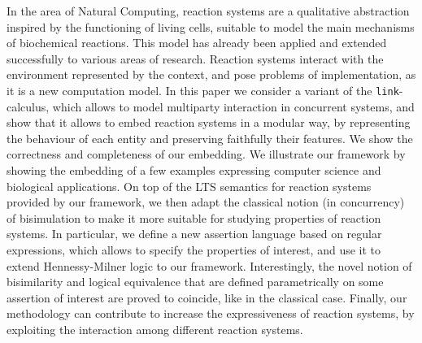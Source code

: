 
In the area of Natural Computing, reaction systems are
a qualitative abstraction inspired by the 
functioning of living cells, suitable to model the main
mechanisms of biochemical reactions.
This model has already been applied
and extended successfully to various areas of research. Reaction 
systems interact with the environment represented by the context, and
pose problems of implementation, as it is a new computation model. 
In this paper we consider a variant of the {\tt link}-calculus, which allows to model 
multiparty interaction in concurrent systems, and show that it allows to
embed reaction systems in a modular way, by representing the behaviour of each entity and
preserving faithfully their features. 
We show the correctness and completeness 
of our embedding.
We illustrate our framework by showing the embedding of 
a few examples expressing computer science
and biological applications.
On top of the LTS semantics for reaction systems provided by our framework, 
we then adapt the classical notion (in concurrency) of bisimulation
to make it more suitable for studying properties of reaction systems.
In particular, we define a new assertion language based on regular expressions, 
which allows to specify the properties of interest, and use it to extend Hennessy-Milner logic
to our framework. Interestingly, the novel notion of bisimilarity and logical equivalence that are defined parametrically on some assertion of interest are proved to coincide, like in the classical case.
Finally, our methodology can contribute to increase the expressiveness
of reaction systems, by exploiting the interaction among 
different reaction systems.
